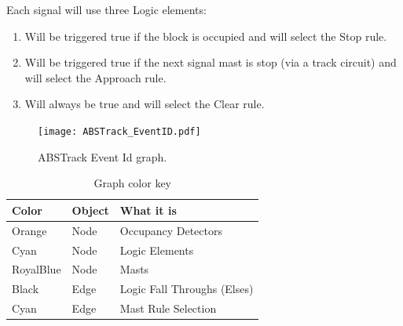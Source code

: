 Each signal will use three Logic elements:

\begin{enumerate}
\item Will be triggered true if the block is occupied and will select the Stop 
rule.
\item Will be triggered true if the next signal mast is stop (via a track 
circuit) and will select the Approach rule.
\item Will always be true and will select the Clear rule.
\end{enumerate}

\begin{figure}[hbpt]\begin{centering}%
\texttt{[image: ABSTrack\_EventID.pdf]}
\caption{ABSTrack Event Id graph.}
\label{fig:ABSTrackEventID}
\end{centering}\end{figure}
\begin{table}[hbpt]\begin{centering}%
\begin{tabular}{|l|l|p{2in}|}
\hline
Color&Object&What it is\\
\hline
Orange&Node&Occupancy Detectors\\
\hline
Cyan&Node&Logic Elements\\
\hline
RoyalBlue&Node&Masts\\
\hline 
Black&Edge&Logic Fall Throughs (Elses)\\
\hline
Cyan&Edge&Mast Rule Selection\\
\hline
\end{tabular}
\caption{Graph color key}
\label{tab:ABSTrackEventID}
\end{centering}\end{table}
                                        
